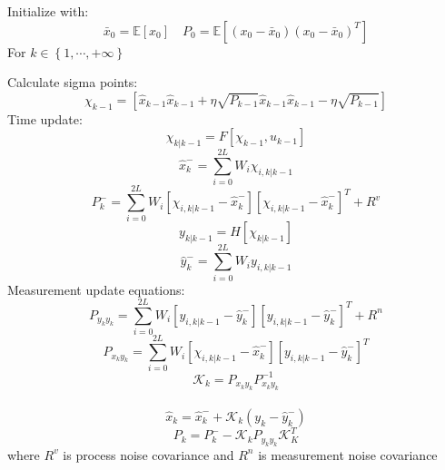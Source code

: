 \documentclass[10pt,twocolumn]{IEEEtran}
\begin{document}
\begin{myframe}[title=UKF algorithm, float]
    Initialize with:
    \begin{equation} \bar{x}_0=\mathbb{E}\left[ x_0 \right] \quad P_0=\mathbb{E}\left[ \left( x_0 - \bar{x}_0 \right) \left( x_0 - \bar{x}_0 \right)^T \right]\label{eq:w15_ukf_first} \end{equation}
    For $k \in \left\{ 1, \cdots, +\infty \right\}$

    Calculate sigma points:
    \begin{equation}
        \chi_{k-1} = \left[ \hat{x}_{k-1} \hat{x}_{k-1}+\eta \sqrt{P_{k-1}} \hat{x}_{k-1} \hat{x}_{k-1}-\eta \sqrt{P_{k-1}} \right]
    \end{equation}
    Time update:
    \begin{equation}
        \chi_{k|k-1}=F\left[ \chi_{k-1}, u_{k-1} \right]
    \end{equation}
    \begin{equation}
        \hat{x}_k^-=\sum_{i=0}^{2L}W_i\chi_{i,k|k-1}
    \end{equation}
    \begin{equation}
        P_k^-=\sum_{i=0}^{2L}W_i\left[ \chi_{i,k|k-1} - \hat{x}_k^- \right] \left[ \chi_{i,k|k-1} - \hat{x}_k^- \right]^T+R^v
    \end{equation}
    \begin{equation}
        y_{k|k-1} = H \left[ \chi_{k|k-1} \right]
    \end{equation}
    \begin{equation}
        \hat{y}_k^-=\sum_{i=0}^{2L}W_i y_{i,k|k-1}
    \end{equation}
    Measurement update equations:
    \begin{equation}
        P_{y_ky_k}=\sum_{i=0}^{2L}W_i \left[ y_{i,k|k-1} - \hat{y}_k^- \right] \left[ y_{i,k|k-1} - \hat{y}_k^- \right]^T +R^n
    \end{equation}
    \begin{equation}
        P_{x_ky_k}=\sum_{i=0}^{2L}W_i\left[ \chi_{i,k|k-1} - \hat{x}_k^- \right] \left[ y_{i,k|k-1} - \hat{y}_k^- \right]^T
    \end{equation}
    \begin{equation}
        \mathcal{K}_k=P_{x_ky_k}P_{x_ky_k}^{-1}
    \end{equation}\
    \begin{equation}
        \hat{x}_k=\hat{x}_k^- +\mathcal{K}_k \left( y_k - \hat{y}_k^- \right)
    \end{equation}
    \begin{equation} \label{eq:w15_ukf_last}
        P_k=P_k^--\mathcal{K}_kP_{y_ky_k}\mathcal{K}_K^T
    \end{equation}
    where $R^v$ is process noise covariance and $R^n$ is measurement noise covariance
\end{myframe}
\end{document}

